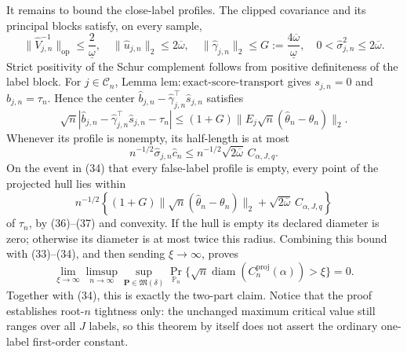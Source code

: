It remains to bound the close-label profiles.  The clipped covariance and its principal blocks satisfy, on every sample,
\[
 \|\widehat V_{j,n}^{-1}\|_{\mathrm{op}}
 \le\frac2{\underline\omega},
 \quad
 \|\widehat u_{j,n}\|_2\le2\overline\omega,
 \quad
 \|\widehat\gamma_{j,n}\|_2
 \le G:=\frac{4\overline\omega}{\underline\omega},
 \quad
 0<\widehat\sigma_{j,n}^2\le2\overline\omega.
\tag{35}
\]
Strict positivity of the Schur complement follows from positive definiteness of the label block.  For \(j\in\mathcal C_n\), Lemma \(\mathrm{lem:exact\text{-}score\text{-}transport}\) gives \(s_{j,n}=0\) and \(b_{j,n}=\tau_n\).  Hence the center
\(
 \widehat b_{j,n}-\widehat\gamma_{j,n}^{\top}\widehat s_{j,n}
\)
satisfies
\[
 \sqrt n\left|
 \widehat b_{j,n}-\widehat\gamma_{j,n}^{\top}\widehat s_{j,n}-\tau_n
 \right|
 \le(1+G)\|E_j\sqrt n(\widehat\theta_n-\theta_n)\|_2.
\tag{36}
\]
Whenever its profile is nonempty, its half-length is at most
\[
 n^{-1/2}\widehat\sigma_{j,n}\widehat c_n
 \le n^{-1/2}\sqrt{2\overline\omega}\,C_{\alpha,J,q}.
\tag{37}
\]
On the event in (34) that every false-label profile is empty, every point of the projected hull lies within
\[
 n^{-1/2}\left\{
 (1+G)\|\sqrt n(\widehat\theta_n-\theta_n)\|_2
 +\sqrt{2\overline\omega}\,C_{\alpha,J,q}
 \right\}
\]
of \(\tau_n\), by (36)--(37) and convexity.  If the hull is empty its declared diameter is zero; otherwise its diameter is at most twice this radius.  Combining this bound with (33)--(34), and then sending \(\xi\to\infty\), proves
\[
 \lim_{\xi\to\infty}\limsup_{n\to\infty}
 \sup_{\mathbf P\in\mathfrak M(\delta)}
 \Pr_{\mathbb P_n}\{\sqrt n\operatorname{diam}
 (C_n^{\mathrm{proj}}(\alpha))>\xi\}=0.
\]
Together with (34), this is exactly the two-part claim.  Notice that the proof establishes root-\(n\) tightness only: the unchanged maximum critical value still ranges over all \(J\) labels, so this theorem by itself does not assert the ordinary one-label first-order constant.
